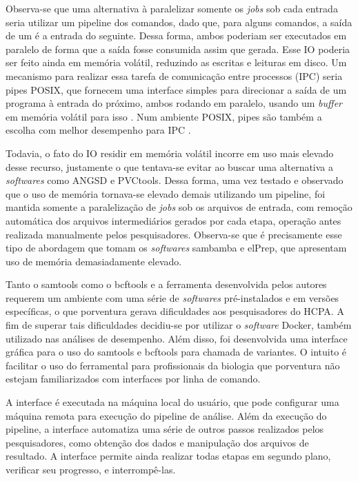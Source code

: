 \documentclass[cic,tc]{iiufrgs}
\begin{document}
Observa-se que uma alternativa à paralelizar somente os \textit{jobs} sob cada
entrada seria utilizar um pipeline dos comandos, dado que, para alguns
comandos, a saída de um é a entrada do seguinte. Dessa forma, ambos poderiam
ser executados em paralelo de forma que a saída fosse consumida assim que
gerada. Esse IO poderia ser feito ainda em memória volátil, reduzindo as
escritas e leituras em disco. Um mecanismo para realizar essa tarefa de
comunicação entre processos (IPC) seria pipes POSIX, que fornecem uma interface
simples para direcionar a saída de um programa à entrada do próximo, ambos
rodando em paralelo, usando um \textit{buffer} em memória volátil para
isso \cite{immich2003performance}. Num ambiente POSIX, pipes são também a
escolha com melhor desempenho para IPC \cite{immich2003performance}.

Todavia, o fato do IO residir em memória volátil incorre em uso mais elevado
desse recurso, justamente o que tentava-se evitar ao buscar uma alternativa a
\textit{softwares} como ANGSD e PVCtools. Dessa forma, uma vez testado e observado que o
uso de memória tornava-se elevado demais utilizando um pipeline, foi mantida
somente a paralelização de \textit{jobs} sob os arquivos de entrada, com
remoção automática dos arquivos intermediários gerados por cada etapa, operação
antes realizada manualmente pelos pesquisadores. Observa-se que é precisamente
esse tipo de abordagem que tomam os \textit{softwares} sambamba e elPrep, que apresentam
uso de memória demasiadamente elevado.

Tanto o samtools como o bcftools e a ferramenta desenvolvida pelos autores
requerem um ambiente com uma série de \textit{softwares} pré-instalados e em versões
específicas, o que porventura gerava dificuldades aos pesquisadores do HCPA. A
fim de superar tais dificuldades decidiu-se por utilizar o \textit{software} Docker,
também utilizado nas análises de desempenho. Além disso, foi desenvolvida uma
interface gráfica para o uso do samtools e bcftools para chamada de variantes.
O intuito é facilitar o uso do ferramental para profissionais da biologia que
porventura não estejam familiarizados com interfaces por linha de comando.

A interface é executada na máquina local do usuário, que pode configurar uma
máquina remota para execução do pipeline de análise. Além da execução do
pipeline, a interface automatiza uma série de outros passos realizados pelos
pesquisadores, como obtenção dos dados e manipulação dos arquivos de resultado.
A interface permite ainda realizar todas etapas em segundo plano, verificar seu
progresso, e interrompê-las.
\end{document}
